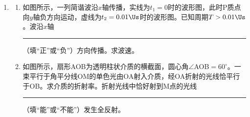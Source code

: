 \documentclass[\gkver]{gaokaozhenti}
\begin{document}
\begin{enumerate}
\begin{enumerate}
\item
气体温度计结构如图所示。玻璃测温泡A内充有理想气体，通过细玻璃管B和水银压强计相连。开始时A处于冰水混合物中，左管C中水银面在O点处，右管D中水银面高出O点$h_{1}=14\Ucm$。后将A放入待测恒温槽中，上下移动D，使C中水银面仍在O点处，测得D中水银面高出O点$h_{2}=44\Ucm$。（已知外界大气压为1个标准大气压，1标准大气压相当于$76\UcmHg$）求恒温槽的温度。此过程A内气体内能\rule{1.5cm}{0.4pt}（填“增大”或“减小”），气体不对外做功，气体将\rule{1.5cm}{0.4pt}（填“吸热”或“放热”）。

\end{enumerate}

\item
\begin{enumerate}
\item
如图所示，一列简谐波沿$x$轴传播，实线为$t_{1}=0$时的波形图，此时P质点向$y$轴负方向运动，虚线为$t_{2}=0.01\Us$时的波形图。已知周期$T>0.01\Us$。波沿$x$轴\rule{1.5cm}{0.4pt}（填“正”或“负”）方向传播。求波速。


\item
如图所示，扇形AOB为透明柱状介质的横截面，圆心角$\angle$AOB$=60^{\circ}$。一束平行于角平分线OM的单色光由OA射入介质，经OA折射的光线恰平行于OB。求介质的折射率。折射光线中恰好射到M点的光线\rule{1.5cm}{0.4pt}（填“能”或“不能”）发生全反射。


\end{enumerate}
\end{enumerate}
\end{document}
